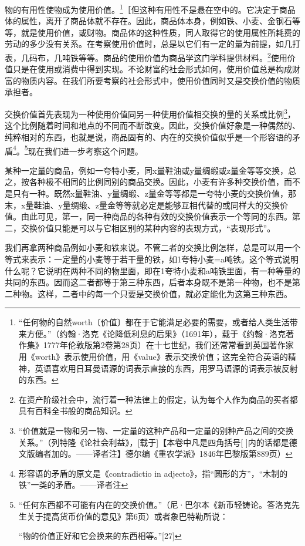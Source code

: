 \documentclass{ctexbook}
\begin{document}
    物的有用性使物成为使用价值。\footnote{“任何物的自然worth〔价值〕都在于它能满足必要的需要，或者给人类生活带来方便。”（约翰·洛克《论降低利息的后果》（1691年），载于《约翰·洛克著作集》1777年伦敦版第2卷第28页）在十七世纪，我们还常常看到英国著作家用《worth》表示使用价值，用《value》表示交换价值；这完全符合英语的精神，英语喜欢用日耳曼语源的词表示直接的东西，用罗马语源的词表示被反射的东西。}［但这种有用性不是悬在空中的。它决定于商品体的属性，离开了商品体就不存在。因此，商品体本身，例如铁、小麦、金钢石等等，就是使用价值，或财物。商品体的这种性质，同人取得它的使用属性所耗费的劳动的多少没有关系。在考察使用价值时，总是以它们有一定的量为前提，如几打表，几码布，几吨铁等等。商品的使用价值为商品学这门学科提供材料。\footnote{在资产阶级社会中，流行着一种法律上的假定，认为每个人作为商品的买者都具有百科全书般的商品知识。}使用价值只是在使用或消费中得到实现。不论财富的社会形式如何，使用价值总是构成财富的物质内容。在我们所要考察的社会形式中，使用价值同时又是交换价值的物质承担者。

    交换价值首先表现为一种使用价值同另一种使用价值相交换的量的关系或比例\footnote{“价值就是一物和另一物、一定量的这种产品和一定量的别种产品之间的交换关系。”（列特隆《论社会利益》，[载于]【本卷中凡是四角括号[ ]内的话都是德文版编者加的。——译者注】德尔编《重农学派》1846年巴黎版第889页）}，这个比例随着时间和地点的不同而不断改变。因此，交换价值好象是一种偶然的、纯粹相对的东西，也就是说，商品固有的、内在的交换价值似乎是一个形容语的矛盾\footnote{形容语的矛盾的原文是《contradictio in adjecto》，指“圆形的方”，“木制的铁”一类的矛盾。——译者注}。\footnote{“任何东西都不可能有内在的交换价值。”（尼·巴尔本《新币轻铸论。答洛克先生关于提高货币价值的意见》第6页）或者象巴特勒所说： %

    “物的价值正好和它会换来的东西相等。”[27]}现在我们进一步考察这个问题。

    某种一定量的商品，例如一夸特小麦，同x量鞋油或y量绸缎或z量金等等交换，总之，按各种极不相同的比例同别的商品交换。因此，小麦有许多种交换价值，而不是只有一种。既然x量鞋油、y量绸缎、z量金等等都是一夸特小麦的交换价值，那末，x量鞋油、y量绸缎、z量金等等就必定是能够互相代替的或同样大的交换价值。由此可见，第一，同一种商品的各种有效的交换价值表示一个等同的东西。第二，交换价值只能是可以与它相区别的某种内容的表现方式，“表现形式”。

    我们再拿两种商品例如小麦和铁来说。不管二者的交换比例怎样，总是可以用一个等式来表示：一定量的小麦等于若干量的铁，如1夸特小麦=a吨铁。这个等式说明什么呢？它说明在两种不同的物里面，即在1夸特小麦和a吨铁里面，有一种等量的共同的东西。因而这二者都等于第三种东西，后者本身既不是第一种物，也不是第二种物。这样，二者中的每一个只要是交换价值，就必定能化为这第三种东西。
\end{document}

